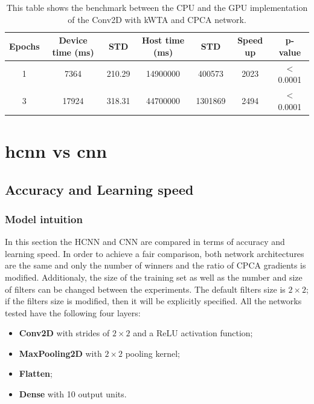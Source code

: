 \documentclass[11pt]{report}
\begin{document}
\begin{table}[h!]
\centering
\begin{tabular}{ c | c c | c c | c c }
Epochs & Device time (ms) & STD & Host time (ms) & STD & Speed up & p-value\\
\hline
1 & 7364  & 210.29 & 14900000 & 400573  & 2023 & $<$ 0.0001 \\
3 & 17924 & 318.31 & 44700000 & 1301869 & 2494 & $<$ 0.0001
\end{tabular}
\caption[Speed benchmark: Conv2D network with CPCA and kWTA]{This table shows the benchmark between the CPU and the GPU implementation of the Conv2D with kWTA and CPCA network.}
\end{table}
\newpage

\section{\acrshort{hcnn} vs \acrshort{cnn}}

\subsection{Accuracy and Learning speed} \label{sec:accuracy_and_learning_speed}

\subsubsection{Model intuition}

In this section the HCNN and CNN are compared in terms of accuracy and learning speed. In order to achieve a fair comparison, both network architectures are the same and only the number of winners and the ratio of CPCA gradients is modified. Additionaly, the size of the training set as well as the number and size of filters can be changed between the experiments. The default filters size is $2\times2$; if the filters size is modified, then it will be explicitly specified. All the networks tested have the following four layers:

\begin{itemize}
	\item \textbf{Conv2D} with strides of $2\times2$ and a ReLU activation function;
	\item \textbf{MaxPooling2D} with $2\times2$ pooling kernel;
	\item \textbf{Flatten};
	\item \textbf{Dense} with 10 output units.
\end{itemize}
\end{document}
